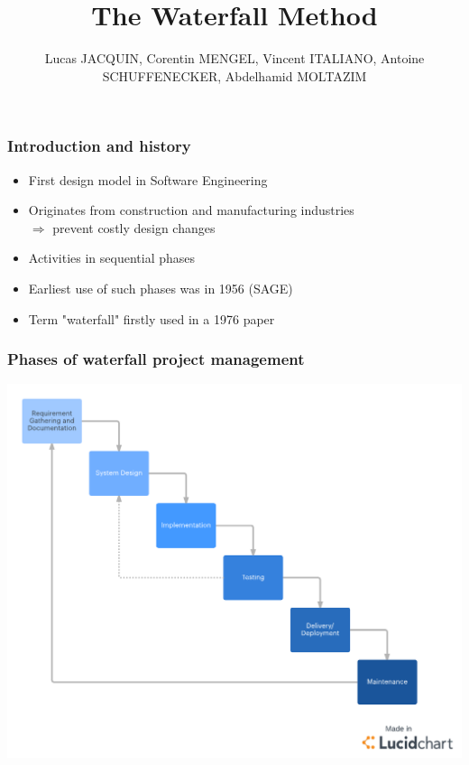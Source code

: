 \documentclass{beamer}
\title{The Waterfall Method}
\author{Lucas JACQUIN, Corentin MENGEL, Vincent ITALIANO, Antoine SCHUFFENECKER, Abdelhamid MOLTAZIM}
\begin{document}
\begin{frame}    
    
    \maketitle

\end{frame}

\begin{frame}
    \frametitle{Introduction and history}
    \begin{itemize}
        \setlength\itemsep{1em}
        \item First design model in Software Engineering \pause
        \item Originates from construction and manufacturing industries \\
        \quad\quad$\Rightarrow$ prevent costly design changes\pause
        \item Activities in sequential phases \pause
        \item Earliest use of such phases was in 1956 (SAGE) \pause
        \item Term "waterfall" firstly used in a 1976 paper
    \end{itemize}
\end{frame}

\begin{frame}
    \frametitle{Phases of waterfall project management}
    \includegraphics[scale=0.25]{Images/WaterfallDiagram.png}
\end{frame}
\end{document}
